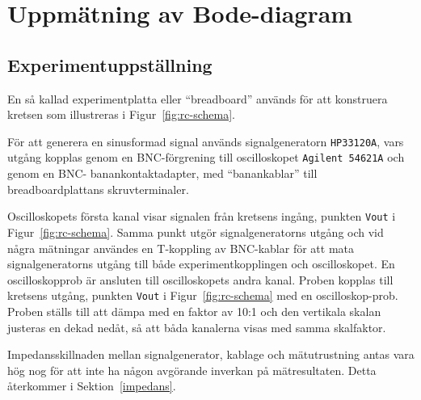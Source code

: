 %
%

\section{Uppmätning av Bode-diagram}\label{bode}

\subsection{Experimentuppställning}\label{}
En så kallad experimentplatta eller ``breadboard'' används för att konstruera
kretsen som illustreras i Figur~\ref{fig:rc-schema}.  \par För att generera en
sinusformad signal används signalgeneratorn \texttt{HP33120A}, vars utgång
kopplas genom en BNC-förgrening till oscilloskopet \texttt{Agilent 54621A} och
genom en BNC- banankontaktadapter, med ``banankablar'' till breadboardplattans
skruvterminaler.  \par Oscilloskopets första kanal visar signalen från kretsens
ingång, punkten \texttt{Vout} i Figur~\ref{fig:rc-schema}. Samma punkt utgör
signalgeneratorns utgång och vid några mätningar användes en T-koppling av
BNC-kablar för att mata signalgeneratorns utgång till både experimentkopplingen
och oscilloskopet.  En oscilloskopprob är ansluten till oscilloskopets andra
kanal. Proben kopplas till kretsens utgång, punkten \texttt{Vout} i
Figur~\ref{fig:rc-schema} med en oscilloskop-prob. Proben ställs till att dämpa
med en faktor av 10:1 och den vertikala skalan justeras en dekad nedåt, så att
båda kanalerna visas med samma skalfaktor.
\par Impedansskillnaden mellan signalgenerator, kablage och mätutrustning antas
vara hög nog för att inte ha någon avgörande inverkan på mätresultaten. Detta
återkommer i Sektion~\ref{impedans}.

